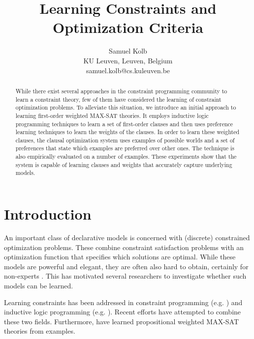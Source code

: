 \documentclass[letterpaper]{article}
\theoremstyle{definition}
\begin{document}
\title{Learning Constraints and Optimization Criteria}
\author{
  Samuel Kolb\\
  KU Leuven, Leuven, Belgium\\
  samuel.kolb@cs.kuleuven.be
}

\maketitle

\begin{abstract}
While there exist several approaches in the constraint programming community to learn a constraint theory, few of them have considered the learning of constraint optimization problems.
To alleviate this situation, we introduce an initial approach to learning first-order weighted MAX-SAT theories. 
It employs inductive logic programming techniques to learn a set of first-order clauses and then uses preference learning techniques to learn the weights of the clauses.
In order to learn these weighted clauses, the clausal optimization system uses examples of possible worlds and a set of preferences that state which examples are preferred over other ones.
The technique is also empirically evaluated on a number of examples.
These experiments show that the system is capable of learning clauses and weights that accurately capture underlying models.
\end{abstract}


\section{Introduction}
An important class of declarative models is concerned with (discrete) constrained optimization problems.
These combine constraint satisfaction problems with an optimization function that specifies which solutions are optimal.
While these models are powerful and elegant, they are often also hard to obtain, certainly for non-experts \cite{Wallace:PrinciplesCP}.
This has motivated several researchers to investigate whether such models can be learned. 

Learning constraints has been addressed in constraint programming (e.g. \cite{Beldiceanu:ModelSeeker,bessiere2013constraint}) and inductive logic programming (e.g. \cite{DeRaedt:ClausalDiscovery}).
Recent efforts \cite{Lallouet:LearningCP} have attempted to combine these two fields.
Furthermore, \cite{campigotto2011active} have learned propositional weighted MAX-SAT theories from examples.
\end{document}
